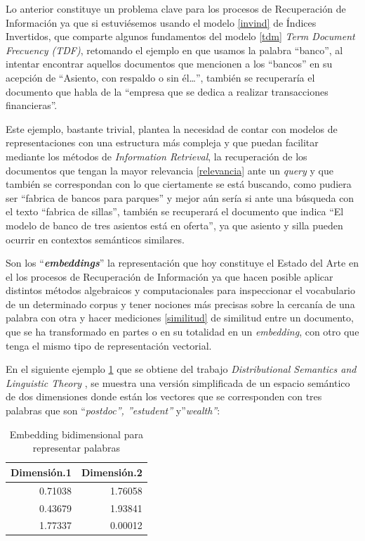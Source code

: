 \documentclass[
  10,
  openany]{book}
\begin{document}
\hfill\break
Lo anterior constituye un problema clave para los procesos de Recuperación de Información ya que si estuviésemos usando el modelo \ref{invind} de Índices Invertidos, que comparte algunos fundamentos del modelo \ref{tdm} \emph{Term Document Frecuency (TDF)}, retomando el ejemplo en que usamos la palabra ``banco'', al intentar encontrar aquellos documentos que mencionen a los ``bancos'' en su acepción de ``Asiento, con respaldo o sin él\ldots{}'', también se recuperaría el documento que habla de la ``empresa que se dedica a realizar transacciones financieras''.

Este ejemplo, bastante trivial, plantea la necesidad de contar con modelos de representaciones con una estructura más compleja y que puedan facilitar mediante los métodos de \emph{Information Retrieval}, la recuperación de los documentos que tengan la mayor relevancia \ref{relevancia} ante un \emph{query} y que también se correspondan con lo que ciertamente se está buscando, como pudiera ser ``fabrica de bancos para parques'' y mejor aún sería si ante una búsqueda con el texto ``fabrica de sillas'', también se recuperará el documento que indica ``El modelo de banco de tres asientos está en oferta'', ya que asiento y silla pueden ocurrir en contextos semánticos similares.

Son los ``\textbf{\emph{embeddings}}'' la representación que hoy constituye el Estado del Arte en el los procesos de Recuperación de Información ya que hacen posible aplicar distintos métodos algebraicos y computacionales para inspeccionar el vocabulario de un determinado corpus y tener nociones más precisas sobre la cercanía de una palabra con otra y hacer mediciones \ref{similitud} de similitud entre un documento, que se ha transformado en partes o en su totalidad en un \emph{embedding}, con otro que tenga el mismo tipo de representación vectorial.~

En el siguiente ejemplo \ref{tab:tblembedding} que se obtiene del trabajo \emph{Distributional Semantics and Linguistic Theory} \citep{boleda2020}, se muestra una versión simplificada de un espacio semántico de dos dimensiones donde están los vectores que se corresponden con tres palabras que son ``\emph{postdoc'', ''estudent''} y''\emph{wealth''}:

\begin{table}

\caption{\label{tab:tblembedding}Embedding bidimensional para representar palabras}
\centering
\begin{tabular}[t]{rr}
\toprule
Dimensión.1 & Dimensión.2\\
\midrule
0.71038 & 1.76058\\
0.43679 & 1.93841\\
1.77337 & 0.00012\\
\bottomrule
\end{tabular}
\end{table}
\end{document}
